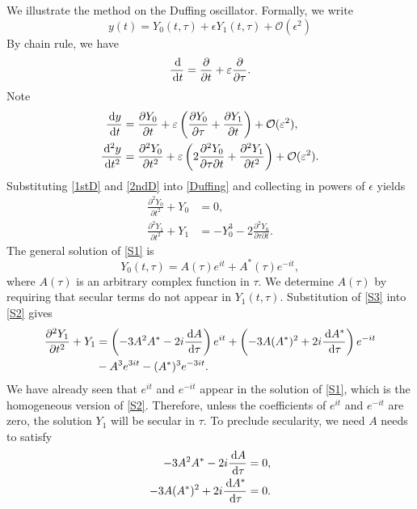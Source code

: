 We illustrate the method on the Duffing oscillator. Formally, we write
\[ y(t) = Y_0(t, \tau) + \epsilon Y_1(t, \tau) + \mathcal{O}(\epsilon^2) \]
By chain rule, we have
\[ \frac{\,\mathrm{d}}{\,\mathrm{d} t} = \frac{\partial}{\partial t} + \varepsilon \frac{\partial}{\partial \tau}. \]
Note
\begin{align}
\frac{\,\mathrm{d} y}{\,\mathrm{d} t} &= \frac{\partial Y_0}{\partial t} + \varepsilon \left( \frac{\partial Y_0}{\partial \tau} + \frac{\partial Y_1}{\partial t} \right) + \mathcal{O}(\varepsilon^2), \label{1stD} \\
\frac{\,\mathrm{d}^2 y}{\,\mathrm{d} t^2} &=\frac{\partial^2 Y_0}{\partial t^2} + \varepsilon \left( 2 \frac{\partial^2 Y_0}{\partial \tau \partial t} + \frac{\partial^2 Y_1}{\partial t^2} \right) + \mathcal{O}(\varepsilon^2). \label{2ndD}
\end{align}
Substituting \eqref{1stD} and \eqref{2ndD} into \eqref{Duffing} and collecting in powers of $\epsilon$ yields
\begin{align}
\frac{\partial^2 Y_0}{\partial t^2} + Y_0 &= 0, \label{S1}\\
\frac{\partial^2 Y_1}{\partial t^2} + Y_1 &= - Y_0^3 - 2 \frac{\partial^2 Y_0}{\partial \tau \partial t}. \label{S2}
\end{align}
The general solution of \eqref{S1} is 
\begin{equation}\label{S3}
Y_0(t, \tau) = A(\tau) e^{it} + A^*(\tau) e^{-it},
\end{equation}
where $A(\tau)$ is an arbitrary complex function in $\tau.$ We determine $A(\tau)$ by requiring that secular terms do not appear in $Y_1(t, \tau).$ Substitution of \eqref{S3} into \eqref{S2} gives
\begin{equation}\label{S4}
\begin{aligned}
\frac{\partial^2 Y_1}{\partial t^2} + Y_1 &=  \left(-3 A^2 A^* - 2i \frac{\,\mathrm{d} A}{\,\mathrm{d} \tau}\right) e^{it} + \left(-3 A (A^*)^2 + 2i \frac{\,\mathrm{d} A^*}{\,\mathrm{d} \tau}\right) e^{-it}\\
&- A^3 e^{3it}  - (A^*)^3 e^{-3it}.
\end{aligned}
\end{equation}
We have already seen that $e^{it}$ and $e^{-it}$ appear in the solution of \eqref{S1}, which is the homogeneous version of \eqref{S2}. Therefore, unless the coefficients of $e^{it}$ and $e^{-it}$ are zero, the solution $Y_1$ will be secular in $\tau.$  To preclude secularity, we need $A$ needs to satisfy
\begin{align*}
-3 A^2 A^* - 2i \frac{\,\mathrm{d} A}{\,\mathrm{d} \tau} &= 0, \\
-3 A (A^*)^2 + 2i \frac{\,\mathrm{d} A^*}{\,\mathrm{d} \tau} &= 0.
\end{align*}
